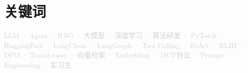 \documentclass[11pt,a4paper]{article}
\begin{document}

\section{关键词}
\textcolor{lightgray}{\small LLM · Agent · RAG · 大模型 · 深度学习 · 算法研发 · PyTorch · HuggingFace · LangChain · LangGraph · Tool Calling · ReAct · RLHF · DPO · Transformer · 向量检索 · Embedding · MCP协议 · Prompt Engineering · 实习生}
\end{document}
